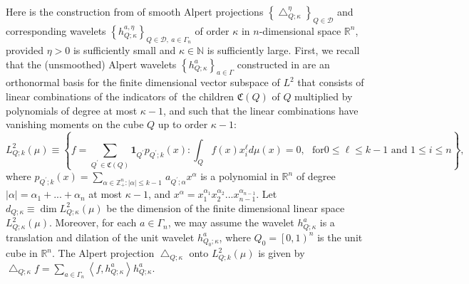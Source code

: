 \documentclass{amsart}%
\theoremstyle{plain}
\numberwithin{equation}{section}
\begin{document}
Here is the construction from \cite{Saw7} of smooth Alpert projections
$\left\{  \bigtriangleup_{Q;\kappa}^{\eta}\right\}  _{Q\in\mathcal{D}}$ and
corresponding wavelets $\left\{  h_{Q;\kappa}^{a,\eta}\right\}  _{Q\in
\mathcal{D},\ a\in\Gamma_{n}}$ of order $\kappa$ in $n$-dimensional space
$\mathbb{R}^{n}$, provided $\eta>0$ is sufficiently small and $\kappa
\in\mathbb{N}$ is sufficiently large. First, we recall that the (unsmoothed)
Alpert wavelets $\left\{  h_{Q;\kappa}^{a}\right\}  _{a\in\Gamma}$ constructed
in \cite{RaSaWi} are an orthonormal basis for the finite dimensional vector
subspace of $L^{2}$ that consists of linear combinations of the indicators
of\ the children $\mathfrak{C}\left(  Q\right)  $ of $Q$ multiplied by
polynomials of degree at most $\kappa-1$, and such that the linear
combinations have vanishing moments on the cube $Q$ up to order $\kappa-1$:%
\[
L_{Q;k}^{2}\left(  \mu\right)  \equiv\left\{
f=\mathop{\displaystyle \sum }\limits_{Q^{\prime}\in\mathfrak{C}\left(
Q\right)  }\mathbf{1}_{Q^{\prime}}p_{Q^{\prime};k}\left(  x\right)  :\int
_{Q}f\left(  x\right)  x_{i}^{\ell}d\mu\left(  x\right)  =0,\ \ \ \text{for
}0\leq\ell\leq k-1\text{ and }1\leq i\leq n\right\}  ,
\]
where $p_{Q^{\prime};k}\left(  x\right)  =\sum_{\alpha\in\mathbb{Z}_{+}%
^{n}:\left\vert \alpha\right\vert \leq k-1\ }a_{Q^{\prime};\alpha}x^{\alpha}$
is a polynomial in $\mathbb{R}^{n}$ of degree $\left\vert \alpha\right\vert
=\alpha_{1}+...+\alpha_{n}$ at most $\kappa-1$, and $x^{\alpha}=x_{1}%
^{\alpha_{1}}x_{2}^{\alpha_{2}}...x_{n-1}^{\alpha_{n-1}}$. Let $d_{Q;\kappa
}\equiv\dim L_{Q;\kappa}^{2}\left(  \mu\right)  $ be the dimension of the
finite dimensional linear space $L_{Q;\kappa}^{2}\left(  \mu\right)  $.
Moreover, for each $a\in\Gamma_{n}$, we may assume the wavelet $h_{Q;\kappa
}^{a}$ is a translation and dilation of the unit wavelet $h_{Q_{0};\kappa}%
^{a}$, where $Q_{0}=\left[  0,1\right)  ^{n}$ is the unit cube in
$\mathbb{R}^{n}$. The Alpert projection $\bigtriangleup_{Q;\kappa}$ onto
$L_{Q;k}^{2}\left(  \mu\right)  $ is given by $\bigtriangleup_{Q;\kappa}%
f=\sum_{a\in\Gamma_{n}}\left\langle f,h_{Q;\kappa}^{a}\right\rangle
h_{Q;\kappa}^{a}$.
\end{document}
